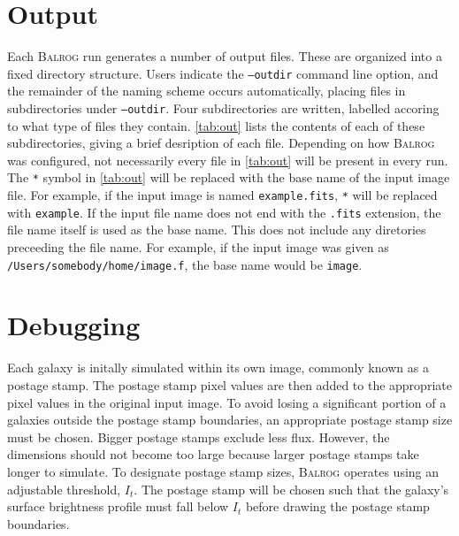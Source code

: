 \documentclass[12pt]{book}
\newcommand{\balrog}{\textsc{Balrog}}
\newcommand{\opt}[1]{\texttt{--#1}}
\begin{document}
\chapter{Output}
\label{sec:out}
Each \balrog{} run generates a number of output files. 
These are organized into a fixed directory structure.
Users indicate the \opt{outdir} command line option, and
the remainder of the naming scheme occurs automatically,
placing files in subdirectories under \opt{outdir}.
Four subdirectories are written, labelled accoring to what
type of files they contain. \autoref{tab:out}
lists the contents of each of these subdirectories,
giving a brief desription of each file. Depending on how
\balrog{} was configured, not necessarily every file
in \autoref{tab:out} will be present in every run.
The \texttt{*} symbol in \autoref{tab:out} will be replaced with
the base name of the input image file. For example,
if the input image is named \texttt{example.fits},
\texttt{*} will be replaced with \texttt{example}.
If the input file name does not end with the \texttt{.fits}
extension, the file name itself is used as the base name.
This does not include any diretories preceeding the file name.
For example, if the input image was given as
\texttt{/Users/somebody/home/image.f}, the
base name would be \texttt{image}.

\outtab{}

\chapter{Debugging}
\label{sec:debug}

Each galaxy is initally simulated within its own image, commonly known as a postage stamp.
The postage stamp pixel values are then added to the appropriate pixel values in the original input image.
To avoid losing a significant portion of a galaxies outside the postage stamp boundaries,
an appropriate postage stamp size must be chosen. 
Bigger postage stamps exclude less flux.
However, the dimensions should not become too large because
larger postage stamps take longer to simulate.
To designate postage stamp sizes, \balrog{} operates using an adjustable threshold, $I_t$.
The postage stamp will be chosen such that the galaxy's surface brightness profile
must fall below $I_t$ before drawing the postage stamp boundaries.
\end{document}
